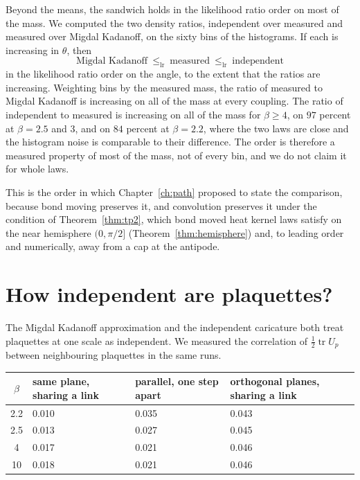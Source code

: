 Beyond the means, the sandwich holds in the likelihood ratio order on most of the mass. We computed the two density ratios, independent over measured and measured over Migdal Kadanoff, on the sixty bins of the histograms. If each is increasing in $\theta$, then
\[
\text{Migdal Kadanoff}\ \le_{\mathrm{lr}}\ \text{measured}\ \le_{\mathrm{lr}}\ \text{independent}
\]
in the likelihood ratio order on the angle, to the extent that the ratios are increasing. Weighting bins by the measured mass, the ratio of measured to Migdal Kadanoff is increasing on all of the mass at every coupling. The ratio of independent to measured is increasing on all of the mass for $\beta\ge4$, on $97$ percent at $\beta=2.5$ and $3$, and on $84$ percent at $\beta=2.2$, where the two laws are close and the histogram noise is comparable to their difference. The order is therefore a measured property of most of the mass, not of every bin, and we do not claim it for whole laws.

This is the order in which Chapter~\ref{ch:path} proposed to state the comparison, because bond moving preserves it, and convolution preserves it under the condition of Theorem~\ref{thm:tp2}, which bond moved heat kernel laws satisfy on the near hemisphere $(0,\pi/2]$ (Theorem~\ref{thm:hemisphere}) and, to leading order and numerically, away from a cap at the antipode.

\section{How independent are plaquettes?}

The Migdal Kadanoff approximation and the independent caricature both treat plaquettes at one scale as independent. We measured the correlation of $\frac12\operatorname{tr}U_p$ between neighbouring plaquettes in the same runs.

\begin{center}
\small
\begin{tabular}{cp{1.1in}p{1.1in}p{1.1in}}
\toprule
$\beta$ & same plane, sharing a link & parallel, one step apart & orthogonal planes, sharing a link \\ \midrule
2.2 & 0.010 & 0.035 & 0.043 \\
2.5 & 0.013 & 0.027 & 0.045 \\
4 & 0.017 & 0.021 & 0.046 \\
10 & 0.018 & 0.021 & 0.046 \\
\bottomrule
\end{tabular}
\end{center}


